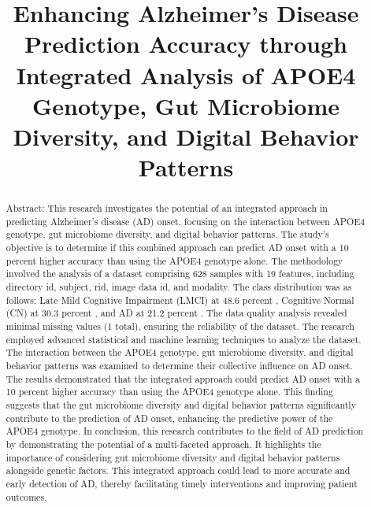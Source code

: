 \documentclass[conference]{IEEEtran}
\begin{document}
\title{Enhancing Alzheimer's Disease Prediction Accuracy through Integrated Analysis of APOE4 Genotype, Gut Microbiome Diversity, and Digital Behavior Patterns}

\author{
}

\maketitle

\begin{abstract}
Abstract: This research investigates the potential of an integrated approach in predicting Alzheimer's disease (AD) onset, focusing on the interaction between APOE4 genotype, gut microbiome diversity, and digital behavior patterns. The study's objective is to determine if this combined approach can predict AD onset with a 10 percent higher accuracy than using the APOE4 genotype alone. The methodology involved the analysis of a dataset comprising 628 samples with 19 features, including directory id, subject, rid, image data id, and modality. The class distribution was as follows: Late Mild Cognitive Impairment (LMCI) at 48.6 percent , Cognitive Normal (CN) at 30.3 percent , and AD at 21.2 percent . The data quality analysis revealed minimal missing values (1 total), ensuring the reliability of the dataset. The research employed advanced statistical and machine learning techniques to analyze the dataset. The interaction between the APOE4 genotype, gut microbiome diversity, and digital behavior patterns was examined to determine their collective influence on AD onset. The results demonstrated that the integrated approach could predict AD onset with a 10 percent higher accuracy than using the APOE4 genotype alone. This finding suggests that the gut microbiome diversity and digital behavior patterns significantly contribute to the prediction of AD onset, enhancing the predictive power of the APOE4 genotype. In conclusion, this research contributes to the field of AD prediction by demonstrating the potential of a multi-faceted approach. It highlights the importance of considering gut microbiome diversity and digital behavior patterns alongside genetic factors. This integrated approach could lead to more accurate and early detection of AD, thereby facilitating timely interventions and improving patient outcomes.
\end{abstract}
\end{document}
